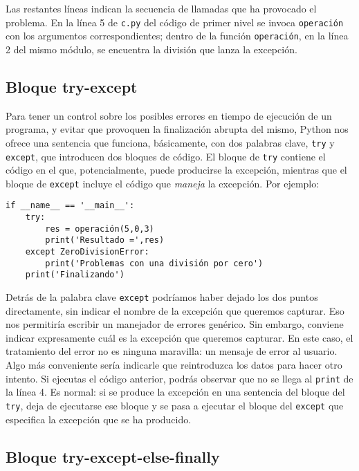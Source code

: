 Las restantes líneas indican la secuencia de llamadas que ha provocado el problema. En la línea 5 de \texttt{c.py} del código de primer nivel se invoca \texttt{operación} con los argumentos correspondientes; dentro de la función \texttt{operación}, en la línea 2 del mismo módulo, se encuentra la división que lanza la excepción. 

\subsection{Bloque try-except}

Para tener un control sobre los posibles errores en tiempo de ejecución de un programa, y evitar que provoquen la finalización abrupta del mismo, Python nos ofrece una sentencia que funciona, básicamente, con dos palabras clave, \texttt{try} y \texttt{except}, que introducen dos bloques de código. El bloque de \texttt{try} contiene el código en el que, potencialmente, puede producirse la excepción, mientras que el bloque de \texttt{except} incluye el código que \emph{maneja} la excepción. Por ejemplo:

\begin{lstlisting}
if __name__ == '__main__':
    try:
        res = operación(5,0,3)
        print('Resultado =',res)
    except ZeroDivisionError:
        print('Problemas con una división por cero')
    print('Finalizando')
\end{lstlisting}

Detrás de la palabra clave \texttt{except} podríamos haber dejado los dos puntos directamente, sin indicar el nombre de la excepción que queremos capturar. Eso nos permitiría escribir un manejador de errores genérico. Sin embargo, conviene indicar expresamente cuál es la excepción que queremos capturar. En este caso, el tratamiento del error no es ninguna maravilla: un mensaje de error al usuario. Algo más conveniente sería indicarle que reintroduzca los datos para hacer otro intento. Si ejecutas el código anterior, podrás observar que no se llega al \texttt{print} de la línea 4. Es normal: si se produce la excepción en una sentencia del bloque del \texttt{try}, deja de ejecutarse ese bloque y se pasa a ejecutar el bloque del \texttt{except} que especifica la excepción que se ha producido.

\subsection{Bloque try-except-else-finally}

